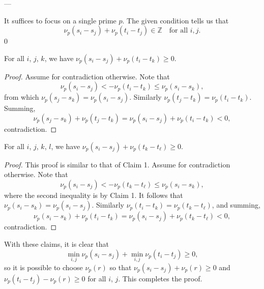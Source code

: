 
---

It suffices to focus on a single prime $p$. The given condition tells us that \[\nu_p(s_i-s_j)+\nu_p(t_i-t_j)\in\mathbb Z\quad\text{for all }i,j.\]
\setcounter{iclaim}0
\begin{iclaim}
    For all $i$, $j$, $k$, we have $\nu_p(s_i-s_j)+\nu_p(t_i-t_k)\ge0$.
\end{iclaim}
\begin{proof}
    Assume for contradiction otherwise. Note that \[\nu_p(s_i-s_j)<-\nu_p(t_i-t_k)\le\nu_p(s_i-s_k),\]
    from which $\nu_p(s_j-s_k)=\nu_p(s_i-s_j)$. Similarly $\nu_p(t_j-t_k)=\nu_p(t_i-t_k)$. Summing, \[\nu_p(s_j-s_k)+\nu_p(t_j-t_k)=\nu_p(s_i-s_j)+\nu_p(t_i-t_k)<0,\]
    contradiction.
\end{proof}
\begin{iclaim}
    For all $i$, $j$, $k$, $l$, we have $\nu_p(s_i-s_j)+\nu_p(t_k-t_\ell)\ge0$.
\end{iclaim}
\begin{proof}
    This proof is similar to that of Claim 1. Assume for contradiction otherwise. Note that \[\nu_p(s_i-s_j)<-\nu_p(t_k-t_\ell)\le\nu_p(s_i-s_k),\]
    where the second inequality is by Claim 1. It follows that $\nu_p(s_i-s_k)=\nu_p(s_i-s_j)$. Similarly $\nu_p(t_i-t_k)=\nu_p(t_k-t_\ell)$, and summing, \[\nu_p(s_i-s_k)+\nu_p(t_i-t_k)=\nu_p(s_i-s_j)+\nu_p(t_k-t_\ell)<0,\]
    contradiction.
\end{proof}

With these claims, it is clear that \[\min_{i,j}\nu_p(s_i-s_j)+\min_{i,j}\nu_p(t_i-t_j)\ge0,\]
so it is possible to choose $\nu_p(r)$ so that $\nu_p(s_i-s_j)+\nu_p(r)\ge0$ and $\nu_p(t_i-t_j)-\nu_p(r)\ge0$ for all $i$, $j$. This completes the proof.
